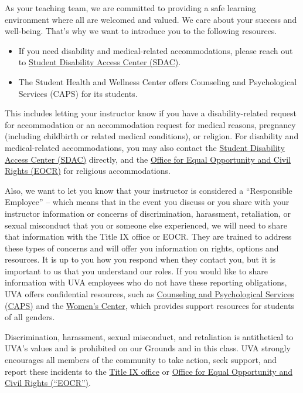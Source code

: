 \documentclass[12pt]{article}
\begin{document}
        As your teaching team, we are committed to providing a safe learning environment where all are welcomed and valued. We care about your success and well-being. That's why we want to introduce you to the following resources.

        \begin{itemize}
            \item If you need disability and medical-related accommodations, please reach out to \href{https://www.studenthealth.virginia.edu/SDAC}{Student Disability Access Center (SDAC)}.
            \item The Student Health and Wellness Center offers Counseling and Psychological Services (CAPS) for its students. 
        \end{itemize}
        
        This includes letting your instructor know if you have a disability-related request for accommodation or an accommodation request for medical reasons, pregnancy (including childbirth or related medical conditions), or religion.  For disability and medical-related accommodations, you may also contact the \href{https://www.studenthealth.virginia.edu/SDAC}{Student Disability Access Center (SDAC)} directly, and the \href{https://eocr.virginia.edu/student-religious-accommodations}{Office for Equal Opportunity and Civil Rights (EOCR)} for religious accommodations.
        
        Also, we want to let you know that your instructor is considered a “Responsible Employee” – which means that in the event you discuss or you share with your instructor information or concerns of discrimination, harassment, retaliation, or sexual misconduct that you or someone else experienced, we will need to share that information with the Title IX office or EOCR. They are trained to address these types of concerns and will offer you information on rights, options and resources.  It is up to you how you respond when they contact you, but it is important to us that you understand our roles.  If you would like to share information with UVA employees who do not have these reporting obligations, UVA offers confidential resources, such as \href{https://www.studenthealth.virginia.edu/CAPS}{Counseling and Psychological Services (CAPS)} and the \href{https://womenscenter.virginia.edu/}{Women’s Center}, which provides support resources for students of all genders.
        
        Discrimination, harassment, sexual misconduct, and retaliation is antithetical to UVA’s values and is prohibited on our Grounds and in this class. UVA strongly encourages all members of the community to take action, seek support, and report these incidents to the \href{https://eocr.virginia.edu/title-ix}{Title IX office} or \href{https://eocr.virginia.edu/}{Office for Equal Opportunity and Civil Rights (“EOCR”)}. 
        
\end{document}
